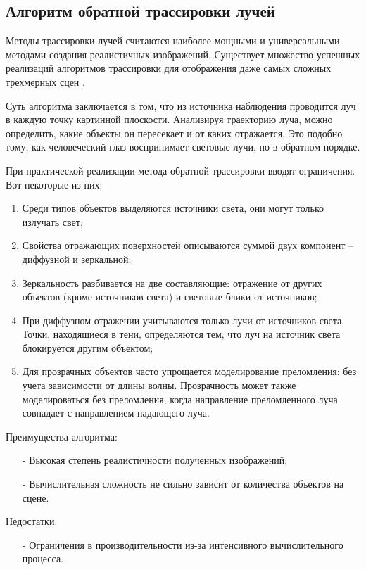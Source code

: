 \subsection{Алгоритм обратной трассировки лучей}

Методы трассировки лучей считаются наиболее мощными и универсальными методами создания реалистичных изображений. Существует множество успешных реализаций алгоритмов трассировки для отображения даже самых сложных трехмерных сцен \cite{b2} \cite{b3}.

Суть алгоритма заключается в том, что из источника наблюдения проводится луч в каждую точку картинной плоскости. Анализируя траекторию луча, можно определить, какие объекты он пересекает и от каких отражается. Это подобно тому, как человеческий глаз воспринимает световые лучи, но в обратном порядке.

При практической реализации метода обратной трассировки вводят ограничения. Вот некоторые из них:
\begin{enumerate}[label=\arabic*)]
	\item Среди типов объектов выделяются источники света, они могут только излучать свет;
	\item Свойства отражающих поверхностей описываются суммой двух компонент -- диффузной и зеркальной;
	\item Зеркальность разбивается на две составляющие: отражение от других объектов (кроме источников света) и световые блики от источников;
	\item При диффузном отражении учитываются только лучи от источников света. Точки, находящиеся в тени, определяются тем, что луч на источник света блокируется другим объектом;
	\item Для прозрачных объектов часто упрощается моделирование преломления: без учета зависимости от длины волны. Прозрачность может также моделироваться без преломления, когда направление преломленного луча совпадает с направлением падающего луча.
\end{enumerate}

Преимущества алгоритма:
\begin{itemize}[label=\arabic*)]
	\item[-] Высокая степень реалистичности полученных изображений;
	\item[-] Вычислительная сложность не сильно зависит от количества объектов на сцене.
\end{itemize}
Недостатки:
\begin{itemize}[label=\arabic*)]
	\item[-] Ограничения в производительности из-за интенсивного вычислительного процесса.
\end{itemize}


